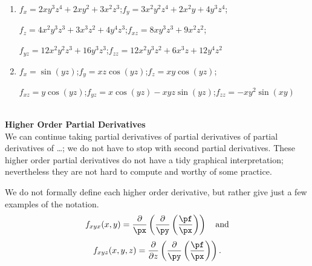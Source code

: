 {\begin{enumerate}
	\item $f_x = 2xy^3z^4+2xy^2+3x^2z^3$;\quad $f_y = 3x^2y^2z^4+2x^2y+4y^3z^4$;
	
	$f_z = 4x^2y^3z^3+3x^3z^2+4y^4z^3$;\quad $f_{xz} = 8xy^3z^3+9x^2z^2$;
	
	$f_{yz} = 12x^2y^2z^3+16y^3z^3$;\quad $f_{zz} = 12x^2y^3z^2+6x^3z+12y^4z^2$
	
	\item	$f_x = \sin(yz)$;\quad $f_y = xz\cos(yz)$;\quad $f_z = xy\cos(yz)$;
	
	$f_{xz} = y\cos(yz)$;\quad $f_{yz} = x\cos(yz) - xyz\sin(yz)$;\quad $f_{zz} = -xy^2\sin(xy)$
	\end{enumerate}
	\baselineskip
}\\

\noindent\textbf{\large Higher Order Partial Derivatives}\\

We can continue taking partial derivatives of partial derivatives of partial derivatives of \ldots; we do not have to stop with second partial derivatives. These higher order partial derivatives do not have a tidy graphical interpretation; nevertheless they are not hard to compute and worthy of some practice. 

We do not formally define each higher order derivative, but rather give just a few examples of the notation.\\
$$f_{xyx}(x,y)  =\frac{\partial}{\px}\left(\frac{\partial}{\py}\left(\frac{\pf}{\px}\right)\right) \quad \text{and}$$
$$f_{xyz}(x,y,z)  =\frac{\partial}{\partial z}\left(\frac{\partial}{\py}\left(\frac{\pf}{\px}\right)\right)  .$$

